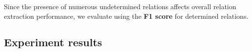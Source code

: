 Since the presence of numerous undetermined relations affects overall relation extraction performance, we evaluate using the \textbf{F1 score} \citep{nguyen2015relation} for determined relations.
\subsection{Experiment results}
 \label{exp_method}

